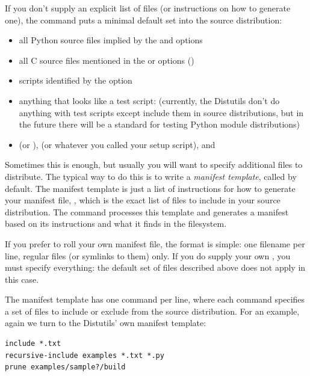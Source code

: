 \documentclass{howto}
\begin{document}
If you don't supply an explicit list of files (or instructions on how to
generate one), the  command puts a minimal default set
into the source distribution:
\begin{itemize}
\item all Python source files implied by the  and
   options
\item all C source files mentioned in the  or
   options ()
\item scripts identified by the  option
\item anything that looks like a test script: 
  (currently, the Distutils don't do anything with test scripts except
  include them in source distributions, but in the future there will be
  a standard for testing Python module distributions)
\item {} (or ),  (or whatever 
  you called your setup script), and 
\end{itemize}

Sometimes this is enough, but usually you will want to specify
additional files to distribute.  The typical way to do this is to write
a \emph{manifest template}, called  by default.  The
manifest template is just a list of instructions for how to generate
your manifest file, , which is the exact list of files to
include in your source distribution.  The  command
processes this template and generates a manifest based on its
instructions and what it finds in the filesystem.

If you prefer to roll your own manifest file, the format is simple: one
filename per line, regular files (or symlinks to them) only.  If you do
supply your own , you must specify everything: the
default set of files described above does not apply in this case.

The manifest template has one command per line, where each command
specifies a set of files to include or exclude from the source
distribution.  For an example, again we turn to the Distutils' own
manifest template:

\begin{verbatim}
include *.txt
recursive-include examples *.txt *.py
prune examples/sample?/build
\end{verbatim}
\end{document}
